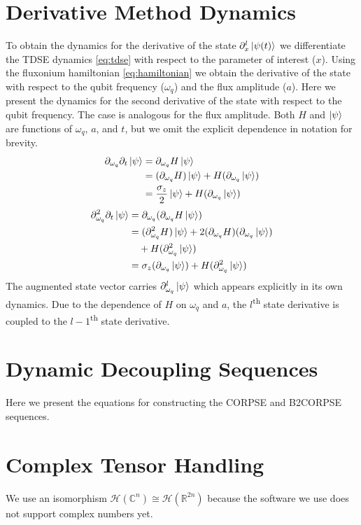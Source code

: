 \documentclass[
  amsfonts,
  amsmath,
  tbtags,
  amssymb,
  aps,
  nobibnotes,
  twocolumn,
]{revtex4-2}
\begin{document}
\section{Derivative Method Dynamics}
To obtain the dynamics for the derivative of the state $\partial_{x}^{l} \ket{\psi(t)}$
we differentiate the TDSE dynamics \ref{eq:tdse} with respect to the parameter of interest
($x$). Using the fluxonium hamiltonian \ref{eq:hamiltonian} we obtain the derivative of the
state with respect to the qubit frequency ($\omega_{q}$) and the flux amplitude ($a$).
Here we present the dynamics for the second derivative of the state with respect to the
qubit frequency. The case is analogous for the flux amplitude. Both $H$ and $\ket{\psi}$ are functions
of $\omega_{q}$, $a$, and $t$, but we omit the explicit dependence in notation for
brevity.
\begin{equation}
  \begin{aligned}
      \partial_{\omega_{q}} \partial_{t} \ket{\psi} &= \partial_{\omega_{q}} H \ket{\psi}\\
      &= (\partial_{\omega_{q}} H) \ket{\psi} + H (\partial_{\omega_{q}} \ket{\psi})\\
      &= \frac{\sigma_{z}}{2} \ket{\psi} + H (\partial_{\omega_{q}} \ket{\psi})
  \end{aligned}
\end{equation}
\begin{equation}
  \begin{aligned}
    \partial_{\omega_{q}}^{2} \partial_{t} \ket{\psi} &= \partial_{\omega_{q}} (\partial_{\omega_{q}} H \ket{\psi})\\
    &= (\partial_{\omega_{q}}^{2} H) \ket{\psi} + 2 (\partial_{\omega_{q}} H)(\partial_{\omega_{q}} \ket{\psi})\\
    &\quad + H (\partial_{\omega_{q}}^{2} \ket{\psi})\\
    &= \sigma_{z} (\partial_{\omega_{q}} \ket{\psi}) + H (\partial_{\omega_{q}}^{2} \ket{\psi})
  \end{aligned}
\end{equation}
The augmented state vector carries $\partial_{\omega_{q}}^{l} \ket{\psi}$
which appears explicitly in its own dynamics. Due to the dependence of $H$ on $\omega_{q}$ and $a$,
the $l$\textsuperscript{th} state derivative is coupled to the
$l - 1$\textsuperscript{th} state derivative.


\section{Dynamic Decoupling Sequences}
Here we present the equations for constructing the CORPSE and
B2CORPSE sequences.


\section{Complex Tensor Handling}
We use an isomorphism $\mathcal{H}(\mathbb{C}^{n}) \cong \mathcal{H}(\mathbb{R}^{2n})$
because the software we use does not support complex numbers yet.



\end{document}
